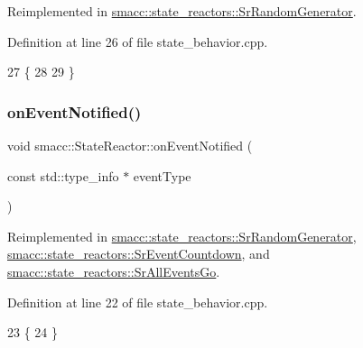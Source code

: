 Reimplemented in \hyperlink{classsmacc_1_1state__reactors_1_1SrRandomGenerator_a093fa3de1ca4f84c74cc0cb0f093cb31}{smacc\+::state\+\_\+reactors\+::\+Sr\+Random\+Generator}.



Definition at line 26 of file state\+\_\+behavior.\+cpp.


\begin{DoxyCode}
27 \{
28 
29 \}
\end{DoxyCode}
\mbox{\label{classsmacc_1_1StateReactor_a17646b3c68a6d80d1e4da8c14238ce36}} 
\subsubsection{\texorpdfstring{on\+Event\+Notified()}{onEventNotified()}}
{\footnotesize\ttfamily void smacc\+::\+State\+Reactor\+::on\+Event\+Notified (\begin{DoxyParamCaption}\item[{const std\+::type\+\_\+info $\ast$}]{event\+Type }\end{DoxyParamCaption})\hspace{0.3cm}{\ttfamily [virtual]}}



Reimplemented in \hyperlink{classsmacc_1_1state__reactors_1_1SrRandomGenerator_a8635347245b76d17355fe374e854144f}{smacc\+::state\+\_\+reactors\+::\+Sr\+Random\+Generator}, \hyperlink{classsmacc_1_1state__reactors_1_1SrEventCountdown_a6cc15cf6633bd882ac40a87d698b3b6b}{smacc\+::state\+\_\+reactors\+::\+Sr\+Event\+Countdown}, and \hyperlink{classsmacc_1_1state__reactors_1_1SrAllEventsGo_abd72dc79374c34111d24691c459850c2}{smacc\+::state\+\_\+reactors\+::\+Sr\+All\+Events\+Go}.



Definition at line 22 of file state\+\_\+behavior.\+cpp.


\begin{DoxyCode}
23 \{
24 \}
\end{DoxyCode}
\mbox{\label{classsmacc_1_1StateReactor_ace125d986cc787c3940306b90bb67f07}} 
